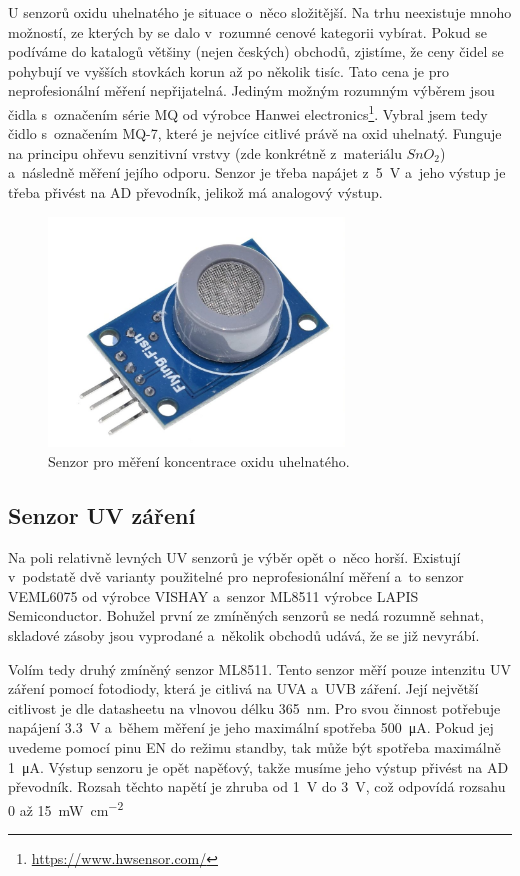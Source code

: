 U senzorů oxidu uhelnatého je situace o~něco složitější. Na trhu neexistuje mnoho možností, ze kterých by se dalo v~rozumné cenové kategorii vybírat. Pokud se podíváme do katalogů většiny (nejen českých) obchodů, zjistíme, že ceny čidel se pohybují ve vyšších stovkách korun až po několik tisíc. Tato cena je pro neprofesionální měření nepřijatelná. Jediným možným rozumným výběrem jsou čidla s~označením série MQ od výrobce Hanwei electronics\footnote{\url{https://www.hwsensor.com/}}. Vybral jsem tedy čidlo s~označením MQ-7, které je nejvíce citlivé právě na oxid uhelnatý. Funguje na principu ohřevu senzitivní vrstvy (zde konkrétně z~materiálu $SnO_{2}$) a~následně měření jejího odporu. Senzor je třeba napájet z~\SI{5}{\volt} a~jeho výstup je třeba přivést na AD převodník, jelikož má analogový výstup.

\begin{figure}
    \centering
    \includegraphics[width=0.7\textwidth]{obrazky/mq7.jpg}
    \caption{Senzor pro měření koncentrace oxidu uhelnatého. \cite{img_mq7}}
    \label{fig_MQ7}
\end{figure}

\subsection{Senzor UV záření}

Na poli relativně levných UV senzorů je výběr opět o~něco horší. Existují v~podstatě dvě varianty použitelné pro neprofesionální měření a~to senzor VEML6075 od výrobce VISHAY a~senzor ML8511 výrobce LAPIS Semiconductor. Bohužel první ze zmíněných senzorů se nedá rozumně sehnat, skladové zásoby jsou vyprodané a~několik obchodů udává, že se již nevyrábí.

Volím tedy druhý zmíněný senzor ML8511. Tento senzor měří pouze intenzitu UV záření pomocí fotodiody, která je citlivá na UVA a~UVB záření. Její největší citlivost je dle datasheetu \cite{dat_ML8511} na vlnovou délku \SI{365}{\nano\metre}. Pro svou činnost potřebuje napájení \SI{3,3}{\volt} a~během měření je jeho maximální spotřeba \SI{500}{\micro\ampere}. Pokud jej uvedeme pomocí pinu EN do režimu standby, tak může být spotřeba maximálně \SI{1}{\micro\ampere}. Výstup senzoru je opět napěťový, takže musíme jeho výstup přivést na AD převodník. Rozsah těchto napětí je zhruba od \SI{1}{\volt} do \SI{3}{\volt}, což odpovídá rozsahu \SI{0}{} až \SI{15}{\milli\watt\per\centi\metre\squared}

